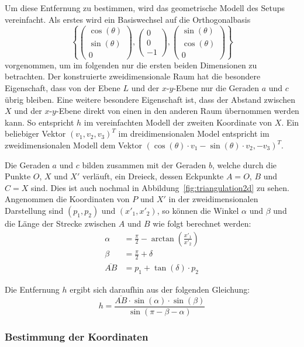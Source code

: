 \documentclass[ngerman,a4paper,parskip=half]{scrartcl}
\begin{document}
Um diese Entfernung zu bestimmen, wird das geometrische Modell des Setups vereinfacht. Als erstes wird ein Basiswechsel auf die Orthogonalbasis
\[ \left\lbrace \begin{pmatrix}
\cos(\theta) \\ \sin(\theta) \\ 0
\end{pmatrix}, \begin{pmatrix}
0 \\ 0 \\ -1
\end{pmatrix}, \begin{pmatrix}
\sin(\theta) \\ \cos(\theta) \\ 0
\end{pmatrix} \right\rbrace \]
vorgenommen, um im folgenden nur die ersten beiden Dimensionen zu betrachten. Der konstruierte zweidimensionale Raum hat die besondere Eigenschaft, dass von der Ebene $L$ und der $x$-$y$-Ebene nur die Geraden $a$ und $c$ übrig bleiben. Eine weitere besondere Eigenschaft ist, dass der Abstand zwischen $X$ und der $x$-$y$-Ebene direkt von einen in den anderen Raum übernommen werden kann. So entspricht $h$ im vereinfachten Modell der zweiten Koordinate von $X$. Ein beliebiger Vektor $(v_1, v_2, v_3)^T$ im dreidimensionalen Model entspricht im zweidimensionalen Modell dem Vektor $(\cos(\theta) \cdot v_1 - \sin(\theta) \cdot v_2, -v_3)^T$.

Die Geraden $a$ und $c$ bilden zusammen mit der Geraden $b$, welche durch die Punkte $O$, $X$ und $X'$ verläuft, ein Dreieck, dessen Eckpunkte $A=O$, $B$ und $C = X$ sind. Dies ist auch nochmal in Abbildung~\ref{fig:triangulation2d} zu sehen. Angenommen die Koordinaten von $P$ und $X'$ in der zweidimensionalen Darstellung sind $(p_1,p_2)$ und $(x'_1, x'_2)$, so können die Winkel $\alpha$ und $\beta$ und die Länge der Strecke zwischen $A$ und $B$ wie folgt berechnet werden:
\begin{align*}
	\alpha &= \frac{\pi}{2} - \arctan\left(\frac{x'_1}{x'_2}\right)\\
	\beta &= \frac{\pi}{2} + \delta\\
	\overline{AB} &= p_1 + \tan(\delta) \cdot p_2
\end{align*}

Die Entfernung $h$ ergibt sich daraufhin aus der folgenden Gleichung:
\[ h = \frac{\overline{AB} \cdot \sin(\alpha) \cdot \sin(\beta)}{\sin(\pi - \beta - \alpha)} \]

\subsubsection{Bestimmung der Koordinaten}
\end{document}
